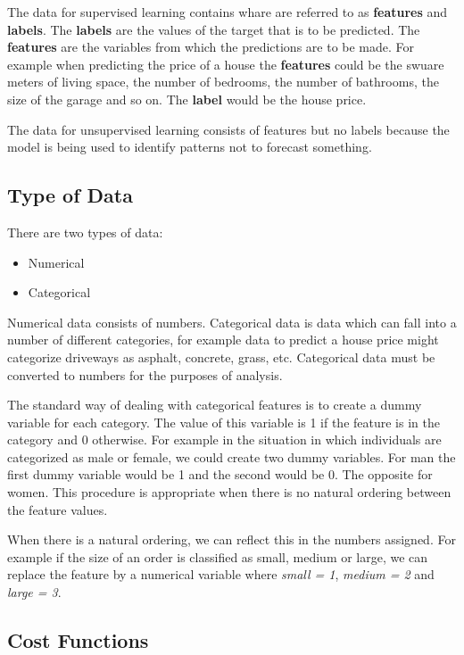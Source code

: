 \documentclass[11pt]{article}
\providecommand{\tightlist}{%
      \setlength{\itemsep}{0pt}\setlength{\parskip}{0pt}}
\begin{document}
The data for supervised learning contains whare are referred to as
\textbf{features} and \textbf{labels}. The \textbf{labels} are the
values of the target that is to be predicted. The \textbf{features} are
the variables from which the predictions are to be made. For example
when predicting the price of a house the \textbf{features} could be the
swuare meters of living space, the number of bedrooms, the number of
bathrooms, the size of the garage and so on. The \textbf{label} would be
the house price.

The data for unsupervised learning consists of features but no labels
because the model is being used to identify patterns not to forecast
something.

    \hypertarget{type-of-data}{%
\subsection{Type of Data}\label{type-of-data}}

There are two types of data:

\begin{itemize}
\tightlist
\item
  Numerical
\item
  Categorical
\end{itemize}

Numerical data consists of numbers. Categorical data is data which can
fall into a number of different categories, for example data to predict
a house price might categorize driveways as asphalt, concrete, grass,
etc. Categorical data must be converted to numbers for the purposes of
analysis.

The standard way of dealing with categorical features is to create a
dummy variable for each category. The value of this variable is 1 if the
feature is in the category and 0 otherwise. For example in the situation
in which individuals are categorized as male or female, we could create
two dummy variables. For man the first dummy variable would be 1 and the
second would be 0. The opposite for women. This procedure is appropriate
when there is no natural ordering between the feature values.

When there is a natural ordering, we can reflect this in the numbers
assigned. For example if the size of an order is classified as small,
medium or large, we can replace the feature by a numerical variable
where \emph{small = 1}, \emph{medium = 2} and \emph{large = 3}.

    \hypertarget{cost-functions}{%
\subsection{Cost Functions}\label{cost-functions}}
\end{document}
